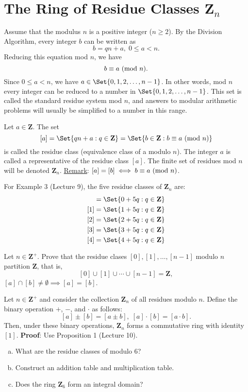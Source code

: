 \section{The Ring of Residue Classes \texorpdfstring{$ \mathbf{Z}_n $}{Zn}}
Assume that the modulus $ n $ is a positive integer ($ n\ge 2 $). By the Division
Algorithm, every integer $ b $ can be written as
\[ b=qn+a,\; 0\le a<n. \]
Reducing this equation mod $ n $, we have
\[ b\equiv a\ (\mathrm{mod}\ n). \]
Since $ 0\le a<n $, we have $ a\in\Set{0,1,2,\ldots,n-1} $. In other words,
mod $ n $ every integer can be reduced to a number in $ \Set{0,1,2,\ldots,n-1} $.
This set is called the standard residue system mod $ n $, and answers to modular arithmetic problems will
usually be simplified to a number in this range.
\begin{Definition}{}{}
    Let $ a\in\mathbf{Z} $. The set
    \[ [a]=\Set{qn+a\given q\in\mathbf{Z}}=\Set{b\in\mathbf{Z}\given b\equiv a\Mod{n}} \]
    is called the residue class (equivalence class of a modulo $ n $). The integer $ a $
    is called a representative of the residue class $ [a] $. The finite
    set of residues mod $ n $ will be denoted $ \mathbf{Z}_n $.
    \tcblower{}
    \underline{Remark}: $ [a]=[b]\iff b\equiv a\ (\mathrm{mod}\ n) $.
\end{Definition}
\begin{Example}{}{}
    For Example 3 (Lecture 9), the five residue classes of $ \mathbf{Z}_n $ are:
    \begin{align*}
        [0] & =\Set{0+5q\given q\in\mathbf{Z}} \\
        [1] & =\Set{1+5q\given q\in\mathbf{Z}} \\
        [2] & =\Set{2+5q\given q\in\mathbf{Z}} \\
        [3] & =\Set{3+5q\given q\in\mathbf{Z}} \\
        [4] & =\Set{4+5q\given q\in\mathbf{Z}} \\
    \end{align*}
\end{Example}
\begin{Exercise}{}{}
    Let $ n\in\mathbf{Z}^+ $. Prove that the residue clases
    $ [0],[1],\ldots,[n-1] $ modulo $ n $ partition $ \mathbf{Z} $, that is,
    \[ [0]\cup [1]\cup\cdots\cup[n-1]=\mathbf{Z}, \]
    $ [a]\cap [b]\ne \emptyset \implies [a]=[b] $.
\end{Exercise}
\begin{Proposition}{}{}
    Let $ n\in\mathbf{Z}^+ $ and consider the collection $ \mathbf{Z}_n $
    of all residues modulo $ n $. Define the binary operation $ + $, $ - $, and $ \cdot $ as follows:
    \[ [a]\pm [b]=[a\pm b],\; [a]\cdot[b]=[a\cdot b]. \]
    Then, under these binary operations, $ \mathbf{Z}_n $ forms a commutative ring with identity $ [1] $.
    \tcblower{}
    \textbf{Proof}: Use Proposition 1 (Lecture 10).
\end{Proposition}
\begin{Example}{}{}
    \begin{enumerate}[(a)]
        \item What are the residue classes of modulo 6?
        \item Construct an addition table and multiplication table.
        \item Does the ring $ \mathbf{Z}_6 $ form an integral domain?
    \end{enumerate}
\end{Example}